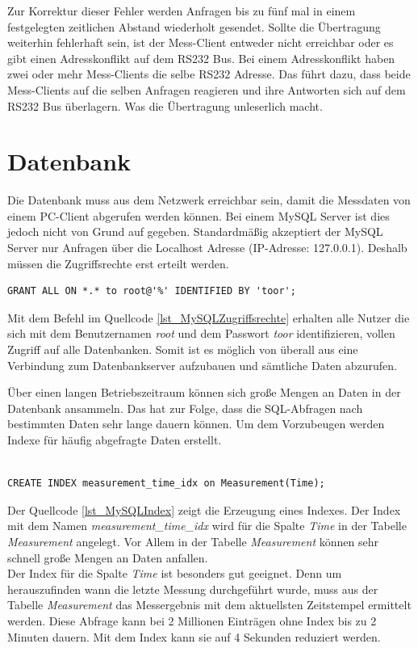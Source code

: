 Zur Korrektur dieser Fehler werden Anfragen bis zu fünf mal in einem festgelegten zeitlichen Abstand wiederholt gesendet. Sollte die Übertragung weiterhin fehlerhaft sein, ist der Mess-Client entweder nicht erreichbar oder es gibt einen Adresskonflikt auf dem RS232 Bus. Bei einem Adresskonflikt haben zwei oder mehr Mess-Clients die selbe RS232 Adresse. Das führt dazu, dass beide Mess-Clients auf die selben Anfragen reagieren und ihre Antworten sich auf dem RS232 Bus überlagern. Was die Übertragung unleserlich macht.




\section{Datenbank}

Die Datenbank muss aus dem Netzwerk erreichbar sein, damit die Messdaten von einem PC-Client abgerufen werden können. Bei einem MySQL Server ist dies jedoch nicht von Grund auf gegeben. Standardmäßig akzeptiert der MySQL Server nur Anfragen über die Localhost Adresse (IP-Adresse: 127.0.0.1). Deshalb müssen die Zugriffsrechte erst erteilt werden.\\

\begin{lstlisting}[caption={MySQL Zugriffsrechte},label=lst_MySQLZugriffsrechte]
GRANT ALL ON *.* to root@'%' IDENTIFIED BY 'toor';
\end{lstlisting}

Mit dem Befehl im Quellcode \ref{lst_MySQLZugriffsrechte} erhalten alle Nutzer die sich mit dem Benutzernamen \textit{root} und dem Passwort \textit{toor} identifizieren, vollen Zugriff auf alle Datenbanken. Somit ist es möglich von überall aus eine Verbindung zum Datenbankserver aufzubauen und sämtliche Daten abzurufen.\ 

Über einen langen Betriebszeitraum können sich große Mengen an Daten in der Datenbank ansammeln. Das hat zur Folge, dass die SQL-Abfragen nach bestimmten Daten sehr lange dauern können. Um dem Vorzubeugen werden Indexe für häufig abgefragte Daten erstellt.\\

\begin{lstlisting}[caption={MySQL Index},label=lst_MySQLIndex]

CREATE INDEX measurement_time_idx on Measurement(Time);

\end{lstlisting}


Der Quellcode \ref{lst_MySQLIndex} zeigt die Erzeugung eines Indexes. Der Index mit dem Namen \textit{measurement\_time\_idx} wird für die Spalte \textit{Time} in der Tabelle \textit{Measurement} angelegt. Vor Allem in der Tabelle \textit{Measurement} können sehr schnell große Mengen an Daten anfallen.\\
Der Index für die Spalte \textit{Time} ist besonders gut geeignet. Denn um herauszufinden wann die letzte Messung durchgeführt wurde, muss aus der Tabelle \textit{Measurement} das Messergebnis mit dem aktuellsten Zeitstempel ermittelt werden. Diese Abfrage kann bei 2 Millionen Einträgen ohne Index bis zu  2 Minuten dauern. Mit dem Index kann sie auf 4 Sekunden reduziert werden.\ 

